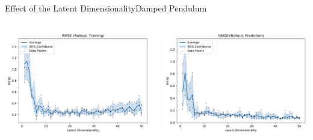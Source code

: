 \documentclass[
	aspectratio=43,
	color={accentcolor=1c},
	logo=false,
	colorframetitle=true,
	handout
]{tudabeamer}
\begin{document}
			\begin{frame}{Effect of the Latent Dimensionality}{Damped Pendulum}
				\begin{columns}[c]
					\begin{column}{0.5\linewidth}
						\begin{center}
							\includegraphics[width=\linewidth]{figures/experiments/pendulum-damped/latent-dim/comparison-rmse-rollout-train-mean-vs-latent-dim.pdf}
						\end{center}
					\end{column}
					\begin{column}{0.5\linewidth}
						\begin{center}
							\includegraphics[width=\linewidth]{figures/experiments/pendulum-damped/latent-dim/comparison-rmse-rollout-prediction-mean-vs-latent-dim.pdf}
						\end{center}
					\end{column}
				\end{columns}
			\end{frame}
\end{document}
